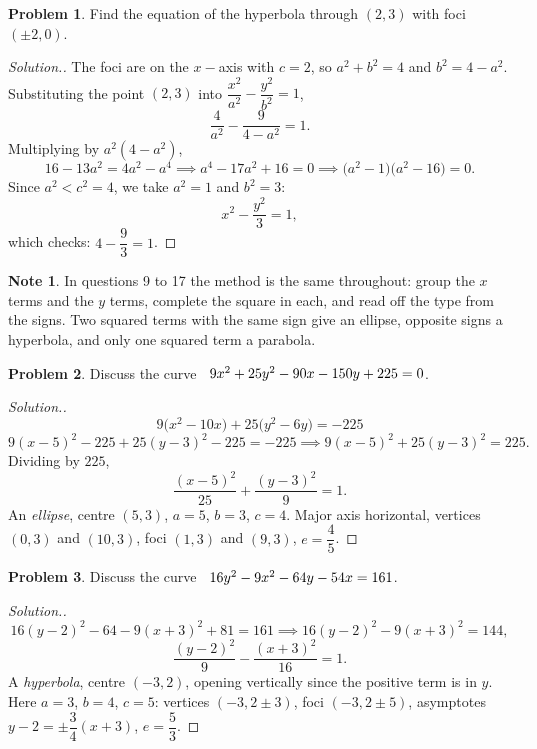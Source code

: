 \documentclass[11pt,a4paper]{article}
\theoremstyle{definition}
\newtheorem*{note}{Note}
\newtheorem{problemx}{Problem}[subsection]
\newenvironment{problem}{\begin{problemx}}{\end{problemx}}
\newenvironment{solution}
  {\renewcommand{\qedsymbol}{}\begin{proof}[\textit{Solution}.]}
  {\end{proof}}
\begin{document}
\begin{problem}
Find the equation of the hyperbola through $(2,3)$ with foci $(\pm 2, 0)$.
\end{problem}
\begin{solution}
The foci are on the $x-$axis with $c = 2$, so $a^2 + b^2 = 4$ and
$b^2 = 4 - a^2$. Substituting the point $(2,3)$ into
$\dfrac{x^2}{a^2} - \dfrac{y^2}{b^2} = 1$,
$$\frac{4}{a^2} - \frac{9}{4-a^2} = 1 .$$
Multiplying by $a^2(4-a^2)$,
$$16 - 13a^2 = 4a^2 - a^4 \implies a^4 - 17a^2 + 16 = 0
\implies \big(a^2-1\big)\big(a^2-16\big) = 0 .$$
Since $a^2 < c^2 = 4$, we take $a^2 = 1$ and $b^2 = 3$:
$$x^2 - \frac{y^2}{3} = 1 ,$$
which checks: $4 - \dfrac{9}{3} = 1$.
\end{solution}

\begin{note}
In questions 9 to 17 the method is the same throughout: group the $x$ terms and
the $y$ terms, complete the square in each, and read off the type from the
signs. Two squared terms with the same sign give an ellipse, opposite signs a
hyperbola, and only one squared term a parabola.
\end{note}

\begin{problem}
Discuss the curve $\hspace{0.2cm} 9x^2 + 25y^2 - 90x - 150y + 225 = 0$.
\end{problem}
\begin{solution}
$$9\big(x^2-10x\big) + 25\big(y^2-6y\big) = -225$$
$$9(x-5)^2 - 225 + 25(y-3)^2 - 225 = -225
\implies 9(x-5)^2 + 25(y-3)^2 = 225 .$$
Dividing by $225$,
$$\frac{(x-5)^2}{25} + \frac{(y-3)^2}{9} = 1 .$$
An \emph{ellipse}, centre $(5,3)$, $a = 5$, $b = 3$, $c = 4$. Major axis
horizontal, vertices $(0,3)$ and $(10,3)$, foci $(1,3)$ and $(9,3)$,
$e = \dfrac{4}{5}$.
\end{solution}

\begin{problem}
Discuss the curve $\hspace{0.2cm} 16y^2 - 9x^2 - 64y - 54x = 161$.
\end{problem}
\begin{solution}
$$16(y-2)^2 - 64 - 9(x+3)^2 + 81 = 161
\implies 16(y-2)^2 - 9(x+3)^2 = 144 ,$$
$$\frac{(y-2)^2}{9} - \frac{(x+3)^2}{16} = 1 .$$
A \emph{hyperbola}, centre $(-3,2)$, opening vertically since the positive term
is in $y$. Here $a = 3$, $b = 4$, $c = 5$: vertices $(-3, 2\pm 3)$, foci
$(-3, 2\pm 5)$, asymptotes $y - 2 = \pm\dfrac{3}{4}(x+3)$, $e = \dfrac{5}{3}$.
\end{solution}
\end{document}
